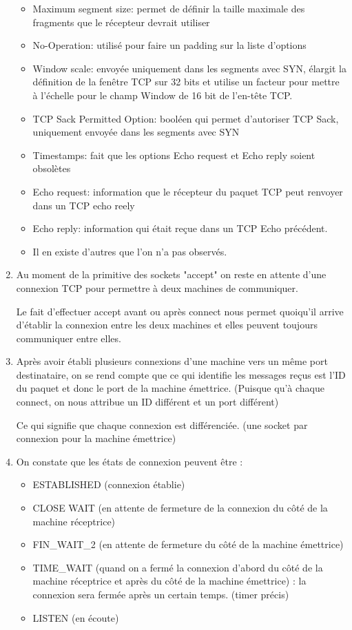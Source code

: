 \documentclass{article}
\begin{document}
\begin{enumerate}[resume]
\begin{itemize}
	\item Maximum segment size: permet de définir la taille maximale des fragments que le récepteur devrait utiliser
	\item No-Operation: utilisé pour faire un padding sur la liste d'options
	\item Window scale: envoyée uniquement dans les segments avec SYN, élargit la définition de la fenêtre TCP sur 32 bits et utilise un facteur pour mettre à l'échelle pour le champ Window de 16 bit de l'en-tête TCP.
	\item TCP Sack Permitted Option: booléen qui permet d'autoriser TCP Sack, uniquement envoyée dans les segments avec SYN
	\item Timestamps: fait que les options Echo request et Echo reply soient obsolètes
	\item Echo request: information que le récepteur du paquet TCP peut renvoyer dans un TCP echo reely
	\item Echo reply: information qui était reçue dans un TCP Echo précédent.
	\item Il en existe d'autres que l'on n'a pas observés.
\end{itemize}

	\item Au moment de la primitive des sockets "accept" on reste en attente d'une connexion TCP pour permettre à deux machines de communiquer.

Le fait d'effectuer accept avant ou après connect nous permet quoiqu'il arrive d'établir la connexion entre les deux machines et elles peuvent toujours communiquer entre elles.

	\item Après avoir établi plusieurs connexions d'une machine vers un même port destinataire, on se rend compte que ce qui identifie les messages reçus est l'ID du paquet et donc le port de la machine émettrice. (Puisque qu'à chaque connect, on nous attribue un ID différent et un port différent)

Ce qui signifie que chaque connexion est différenciée. (une socket par connexion pour la machine émettrice)

	\item On constate que les états de connexion peuvent être :

	\begin{itemize}
		\item ESTABLISHED (connexion établie)
		\item CLOSE WAIT (en attente de fermeture de la connexion du côté de la machine réceptrice)
		\item  FIN\_WAIT\_2 (en attente de fermeture du côté de la machine émettrice)
		\item TIME\_WAIT (quand on a fermé la connexion d'abord du côté de la machine réceptrice et après du côté de la machine émettrice) : la connexion sera fermée après un certain temps. (timer précis)
		\item LISTEN (en écoute)
	\end{itemize}



\end{enumerate}
\end{document}
